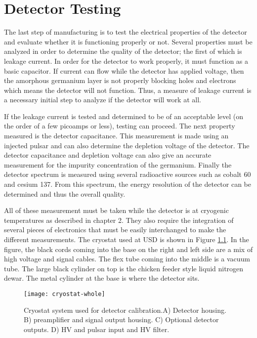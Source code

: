 \chapter{Detector Testing}
The last step of manufacturing is to test the electrical properties of the detector and evaluate whether it is functioning properly or not.
Several properties must be analyzed in order to determine the quality of the detector; the first of which is leakage current.
In order for the detector to work properly, it must function as a basic capacitor.
If current can flow while the detector has applied voltage, then the amorphous germanium layer is not properly blocking holes and electrons which means the detector will not function.
Thus, a measure of leakage current is a necessary initial step to analyze if the detector will work at all.

If the leakage current is tested and determined to be of an acceptable level (on the order of a few picoamps or less), testing can proceed.
The next property measured is the detector capacitance.
This measurement is made using an injected pulsar and can also determine the depletion voltage of the detector.
The detector capacitance and depletion voltage can also give an accurate measurement for the impurity concentration of the germanium.
Finally the detector spectrum is measured using several radioactive sources such as cobalt 60 and cesium 137.
From this spectrum, the energy resolution of the detector can be determined and thus the overall quality.

All of these measurement must be taken while the detector is at cryogenic temperatures as described in chapter 2.
They also require the integration of several pieces of electronics that must be easily interchanged to make the different measurements.
The cryostat used at USD is shown in Figure \ref{fig:cryostat-whole}.
In the figure, the black cords coming into the base on the right and left side are a mix of high voltage and signal cables.
The flex tube coming into the middle is a vacuum tube.
The large black cylinder on top is the chicken feeder style liquid nitrogen dewar.
The metal cylinder at the base is where the detector sits.
\begin{figure}[htpb]
\centering
\texttt{[image: cryostat-whole]}
  \caption{Cryostat system used for detector calibration.A) Detector housing. B) preamplifier and signal output housing. C) Optional detector outputs. D) HV and pulsar input  and HV filter.}
\label{fig:cryostat-whole}
\end{figure}

